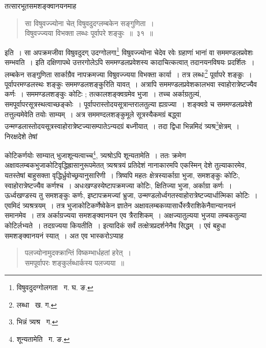 \documentclass[11pt, openany]{book}
\begin{document}
\indent तत्सारभूतसमशङ्क्वानयनमाह\textendash

\begin{quote}
{\ab सा विषुवज्ज्योना चेत् विषुवदुदग्लम्बकेन सङ्गुणिता~। \\
 विषुवज्ज्यया विभक्ता लब्धः पूर्वापरे शङ्कुः~॥~३१~॥} 
\end{quote}

\indent इति~। सा अपक्रमजीवा विषुवदुदग् उदग्गोलगा\renewcommand{\thefootnote}{१}\footnote{विषुवदुदग्गोलगता \textendash\ ग. घ. ङ.} विषुवज्ज्योना चेदेव रवेः ग्रहाणां भानां वा सममण्डलप्रवेशः सम्भवति~। इति दक्षिणापथे उत्तरगोलेऽपि सममण्डलप्रवेशस्य कादाचित्कत्वात् तदानयनविषयः प्रदर्शितः~। लम्बकेन सङ्गुणिता सार्काग्रैव नापक्रमज्या विषुवज्ज्यया विभक्ता कार्या~। तत्र लब्धः\renewcommand{\thefootnote}{२}\footnote{लब्धा \textendash\ ख. ग.} पूर्वापरे शङ्कुः~। पूर्वापरमण्डलस्थः शङ्कुः सममण्डलशङ्कुरिति यावत्~। अत्रापि सममण्डलप्रवेशकालभवा स्वाहोरात्रेष्टज्यैव कर्णः~। सममण्डलशङ्कुः कोटिः ; तत्कालशङ्क्वग्रमेव भुजा~। तच्च अर्काग्रतुल्यं, समपूर्वापरसूत्रस्थत्वाच्छङ्कोः~। पूर्वापरास्तोदयसूत्रान्तरालतुल्या ह्यग्रज्या~। शङ्क्वग्रे च सममण्डलप्रवेशे तत्तुल्यमेवेति तयोः साम्यम्~। अत्र सममण्दलशङ्कुमूले सूत्रस्यैकमग्रं बद्ध्वा उन्मण्डलास्तोदयसूत्रस्वाहोरात्रेष्टज्यासम्पातेऽन्यदग्रं बध्नीयात्~। तदा द्विधा भिन्नमिदं त्र्यश्र\renewcommand{\thefootnote}{३}\footnote{भिन्नं त्र्यश्र \textendash\ ग.}क्षेत्रम्~। निरक्षदेशे तेषां 

\newpage

\noindent कोटिकर्णयोः साम्यात् भुजाशून्यत्वाच्च\renewcommand{\thefootnote}{१}\footnote{शून्यतामेति \textendash\ ग. ङ.}, त्र्यश्रोऽपि शून्यतामेति~। ततः क्रमेण अक्षावलम्बकभुजाकोटिवृद्धिह्रासानुरूपमेतत् त्र्यश्रत्रयं प्रतिदेशं नानाकारमपि एकस्मिन् देशे तुल्याकारमेव, यतस्तेषां बाहुसक्ता वृद्धिर्ध्रुवोच्छ्रयानुसारिणी~। त्रिष्वपि महतः क्षेत्रस्यार्काग्रा भुजा, समशङ्कुः कोटिः, स्वाहोरात्रेष्टज्यैव कर्णश्च~। अधःखण्डस्येष्टापक्रमज्या कोटिः, क्षितिज्या भुजा, अर्काग्रा कर्णः~। ऊर्ध्वखण्डस्य तु समशङ्कुः कर्णः, इष्टापक्रमज्यां भ्रुजा, 
उन्मण्डलोर्ध्वगतस्वाहोरात्रेष्टज्यार्धात्मिका कोटिः~। एवमिदं त्र्यश्रत्रयम्~। तत्र भुजाकोटिकर्णेष्वेकेन ज्ञातेन
अक्षावलम्बकव्यासार्धैस्त्रैराशिकेनैवान्यानयनं समानमेव~। तत्र अर्काग्रज्यया समशङ्क्वानयन एव त्रैराशिकम्~। अक्षज्यातुल्यया भुजया लम्बकतुल्या कोटिर्लभ्यते~। तदग्रज्यया कियतीति~। इत्यादिकं सर्वं तत्क्षेत्रप्रदर्शनेनैव सिद्धम्~। एवं बहुधा समशङ्क्वानयनं स्यात्~। अत एव भास्करोऽप्याह\textendash 

\begin{quote}
{\qt पलज्योनामुदक्क्रान्तिं विष्कम्भार्धहतां हरेत्~। \\
समपूर्वापरः शङ्कुर्लब्धार्कस्य पलज्यया~॥} 
\end{quote}
 
\end{document}
